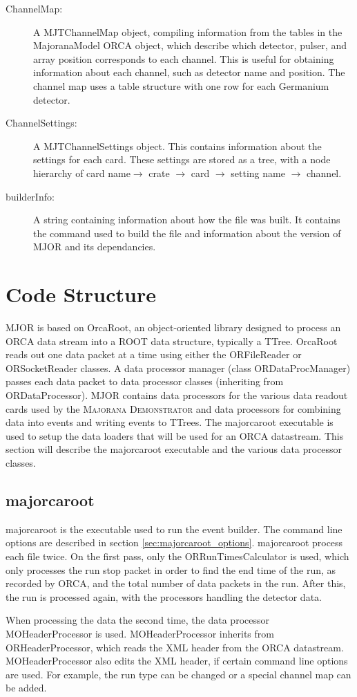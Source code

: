 \documentclass[/main.tex]{subfiles}
\begin{document}
\begin{description}
\item[ChannelMap:] A MJTChannelMap object, compiling information from the tables in the MajoranaModel ORCA object, which describe which detector, pulser, and array position corresponds to each channel. This is useful for obtaining information about each channel, such as detector name and position. The channel map uses a table structure with one row for each Germanium detector.
  
\item[ChannelSettings:] A MJTChannelSettings object. This contains information about the settings for each card. These settings are stored as a tree, with a node hierarchy of card name$\rightarrow$ crate $\rightarrow$ card $\rightarrow$ setting name $\rightarrow$ channel.

\item[builderInfo:] A string containing information about how the file was built. It contains the command used to build the file and information about the version of MJOR and its dependancies.
  
\end{description}



\section{Code Structure}
MJOR is based on OrcaRoot, an object-oriented \cpp library designed to process an ORCA data stream into a ROOT data structure, typically a TTree.
OrcaRoot reads out one data packet at a time using either the ORFileReader or ORSocketReader classes.
A data processor manager (class ORDataProcManager) passes each data packet to data processor classes (inheriting from ORDataProcessor).
MJOR contains data processors for the various data readout cards used by the \textsc{Majorana Demonstrator} and data processors for combining data into events and writing events to TTrees.
The majorcaroot executable is used to setup the data loaders that will be used for an ORCA datastream.
This section will describe the majorcaroot executable and the various data processor classes.

\subsection{majorcaroot}
majorcaroot is the executable used to run the event builder.
The command line options are described in section \ref{sec:majorcaroot_options}.
majorcaroot process each file twice.
On the first pass, only the ORRunTimesCalculator is used, which only processes the run stop packet in order to find the end time of the run, as recorded by ORCA, and the total number of data packets in the run.
After this, the run is processed again, with the processors handling the detector data.
\par
When processing the data the second time, the data processor MOHeaderProcessor is used.
MOHeaderProcessor inherits from ORHeaderProcessor, which reads the XML header from the ORCA datastream.
MOHeaderProcessor also edits the XML header, if certain command line options are used.
For example, the run type can be changed or a special channel map can be added.
\end{document}
